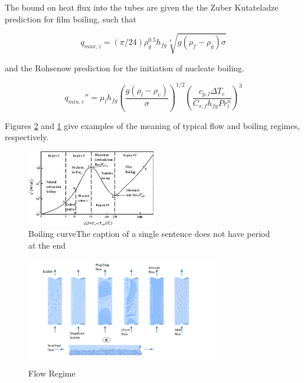 \documentclass[compileTAMUreport.tex]{subfiles}
\begin{document}
The bound on heat flux into the tubes are given the the Zuber Kutateladze prediction for film boiling, such that

\begin{equation}
q_{max,z} = (\pi/24)\rho_g^{0.5} h_{fg} \sqrt[4]{g (\rho_{f} - \rho_{g}) \sigma}
\end{equation}

and the Rohsenow prediction for the initiation of nucleate boiling. 
\cite{Incropera}

\begin{equation}
q_{min,r}'' = \mu_l h_{fg} \left( \frac{g (\rho_l - \rho_v)}{\sigma} \right)^{1/2} \left( \frac{c_{p,l} \Delta T_e}{C_{s,f} h_{fg} Pr_l^n} \right)^3
\end{equation}

Figures \ref{fig:flowregime} and \ref{fig:boilingregime} give examples of the meaning of typical flow and boiling regimes, respectively.

\begin{figure}
\centering
\includegraphics[width=0.5\textwidth]{./figure/400px-Boiling}
\caption{Boiling curveThe caption of a single sentence does not have period at the end}
\label{fig:boilingregime}
\end{figure}

\begin{figure}[t]
\begin{center}
\includegraphics[width=0.75\textwidth]{./figure/flow_regime}
\end{center}
\caption{Flow Regime}
\label{fig:flowregime}
\end{figure}
\end{document}
